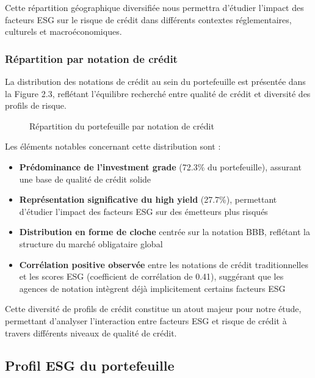Cette répartition géographique diversifiée nous permettra d'étudier l'impact des facteurs ESG sur le risque de crédit dans différents contextes réglementaires, culturels et macroéconomiques.

\subsubsection{Répartition par notation de crédit}

La distribution des notations de crédit au sein du portefeuille est présentée dans la Figure 2.3, reflétant l'équilibre recherché entre qualité de crédit et diversité des profils de risque.

\begin{figure}[h]
\centering
\caption{Répartition du portefeuille par notation de crédit}
\end{figure}

Les éléments notables concernant cette distribution sont :

\begin{itemize}
    \item \textbf{Prédominance de l'investment grade} (72.3\% du portefeuille), assurant une base de qualité de crédit solide
    
    \item \textbf{Représentation significative du high yield} (27.7\%), permettant d'étudier l'impact des facteurs ESG sur des émetteurs plus risqués
    
    \item \textbf{Distribution en forme de cloche} centrée sur la notation BBB, reflétant la structure du marché obligataire global
    
    \item \textbf{Corrélation positive observée} entre les notations de crédit traditionnelles et les scores ESG (coefficient de corrélation de 0.41), suggérant que les agences de notation intègrent déjà implicitement certains facteurs ESG
\end{itemize}

Cette diversité de profils de crédit constitue un atout majeur pour notre étude, permettant d'analyser l'interaction entre facteurs ESG et risque de crédit à travers différents niveaux de qualité de crédit.

\subsection{Profil ESG du portefeuille}

